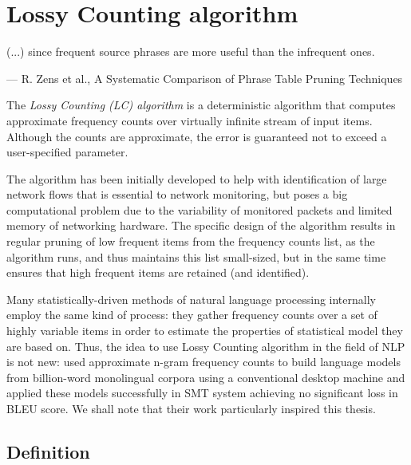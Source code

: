 \chapter{Lossy Counting algorithm}
\label{chap:lossy-counting}

\setlength{\epigraphwidth}{1.0\textwidth}
\epigraph{(...) since frequent source phrases are more useful than the infrequent ones.}{--- R. Zens et al., A Systematic Comparison of Phrase Table Pruning Techniques}

The \emph{Lossy Counting (LC) algorithm} \citep{manku:lossycounting} is
a deterministic algorithm that computes approximate frequency counts
over virtually infinite stream of input items.
Although the counts are approximate, the error is guaranteed not to exceed
a user-specified parameter.

The algorithm has been initially developed to help with identification of
large network flows that is essential to network monitoring, but poses a big
computational problem due to the variability of monitored packets and limited
memory of networking hardware.
The specific design of the algorithm results in regular pruning of low frequent
items from the frequency counts list, as the algorithm runs, and thus maintains
this list small-sized, but in the same time ensures that high frequent items are
retained (and identified).

Many statistically-driven methods of natural language processing internally
employ the same kind of process: they gather frequency counts over a set of highly
variable items in order to estimate the properties of statistical model they are
based on.
Thus, the idea to use Lossy Counting algorithm in the field of NLP is not new:
\citet{goyal:streaminglm} used approximate n-gram frequency counts to build language
models from billion-word monolingual corpora using a conventional desktop machine and
applied these models successfully in SMT system achieving no significant loss in BLEU
score. We shall note that their work particularly inspired this thesis.

\section{Definition}
\label{sec:lossy-counting-definition}

